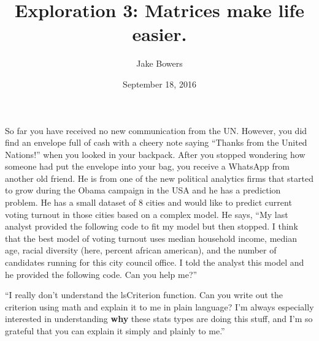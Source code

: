 \documentclass[10pt,]{article}
\title{Exploration 3: Matrices make life easier.}
\author{Jake Bowers}
\date{September 18, 2016}
\newenvironment{Shaded}{\begin{snugshade}}{\end{snugshade}}
\newcommand{\KeywordTok}[1]{\textcolor[rgb]{0.13,0.29,0.53}{\textbf{{#1}}}}
\newcommand{\DataTypeTok}[1]{\textcolor[rgb]{0.13,0.29,0.53}{{#1}}}
\newcommand{\DecValTok}[1]{\textcolor[rgb]{0.00,0.00,0.81}{{#1}}}
\newcommand{\StringTok}[1]{\textcolor[rgb]{0.31,0.60,0.02}{{#1}}}
\newcommand{\NormalTok}[1]{{#1}}
\begin{document}
\maketitle



So far you have received no new communication from the UN. However, you
did find an envelope full of cash with a cheery note saying ``Thanks
from the United Nations!'' when you looked in your backpack. After you
stopped wondering how someone had put the envelope into your bag, you
receive a WhatsApp from another old friend. He is from one of the new
political analytics firms that started to grow during the Obama campaign
in the USA and he has a prediction problem. He has a small dataset of 8
cities and would like to predict current voting turnout in those cities
based on a complex model. He says, ``My last analyst provided the
following code to fit my model but then stopped. I think that the best
model of voting turnout uses median household income, median age, racial
diversity (here, percent african american), and the number of candidates
running for this city council office. I told the analyst this model and
he provided the following code. Can you help me?''

\begin{Shaded}
\end{Shaded}

``I really don't understand the lsCriterion function. Can you write out
the criterion using math and explain it to me in plain language? I'm
always especially interested in understanding \textbf{why} these stats
types are doing this stuff, and I'm so grateful that you can explain it
simply and plainly to me.''

\begin{Shaded}
\end{Shaded}
\end{document}
